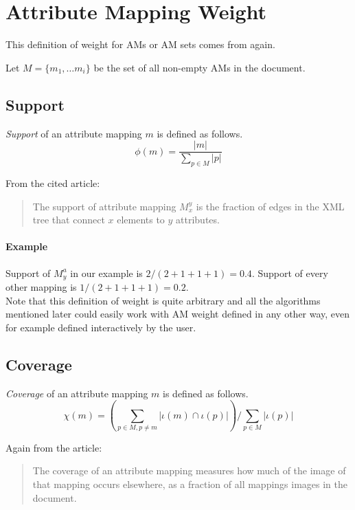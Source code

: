 \section{Attribute Mapping Weight}
\label{section-definitions-weight}

This definition of weight for AMs or AM sets comes from \cite{fidax} again.

Let $M = \{m_1, \dots m_i\}$ be the set of all non-empty AMs in the document.

\subsection{Support}

\begin{define}[Support]
\textit{Support} of an attribute mapping $m$ is defined as follows.
\[\phi(m) = \frac{|m|}{\sum_{p \in M}|p|}\]
\end{define}

From the cited article:
\begin{quote}
The support of attribute mapping $M_x^y$ is the fraction of edges in the XML tree that connect $x$ elements to $y$ attributes.
\end{quote}

\paragraph{Example}
Support of $M_{y}^{a}$ in our example is $2 / (2+1+1+1) = 0.4$. Support of every other mapping is $1 / (2+1+1+1) = 0.2$.\\

Note that this definition of weight is quite arbitrary and all the algorithms mentioned later could easily work with AM weight defined in any other way, even for example defined interactively by the user.

\subsection{Coverage}

\begin{define}[Coverage]
\textit{Coverage} of an attribute mapping $m$ is defined as follows.
\[\chi(m) = \left( \sum_{p \in M, p \neq m} |\iota(m) \cap \iota(p)| \right) / \sum_{p \in M} |\iota(p)|\]
\end{define}

Again from the article:
\begin{quote}
The coverage of an attribute mapping measures how much of the image of that mapping occurs elsewhere, as a fraction of all mappings images in the document.
\end{quote}


